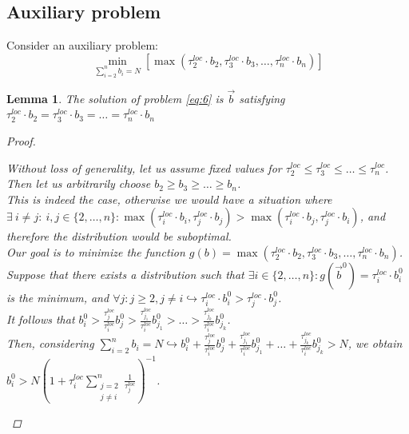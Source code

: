 \documentclass{article}
\newtheorem{lemma}[theorem]{Lemma}
\begin{document}
\subsection{Auxiliary problem}
Consider an auxiliary problem:
\begin{equation}
    \label{eq:6}
    \underset{\sum\limits_{i = 2}^{n} b_i = N}{\min} [\max(\tau_2^{loc}\cdot b_2, \tau_3^{loc}\cdot b_3, \ldots, \tau_n^{loc}\cdot b_n)]
\end{equation}


\begin{lemma}
    \label{l1}
    The solution of problem \eqref{eq:6} is $\overrightarrow{b}$ satisfying $\tau_2^{loc}\cdot b_2 = \tau_3^{loc}\cdot b_3 = \ldots = \tau_n^{loc}\cdot b_n$

    \begin{proof}
        \begin{spacing}{1.3}
        
        Without loss of generality, let us assume fixed values for $\tau_2^{loc}\leq \tau_3^{loc}\leq \ldots \leq \tau_n^{loc}$. \\
        Then let us arbitrarily choose $b_2\geq b_3\geq \ldots \geq b_n$.
        \\
        This is indeed the case, otherwise we would have a situation where $\exists ~ i \neq j: ~ i, j\in \{2, \ldots, n\} : \max(\tau_i^{loc}\cdot b_i, \tau_j^{loc}\cdot b_j) > \max(\tau_i^{loc}\cdot b_j, \tau_j^{loc}\cdot b_i)$, and therefore the distribution would be suboptimal. 
        \\
        Our goal is to minimize the function $g(b) = \max(\tau_2^{loc}\cdot b_2, \tau_3^{loc}\cdot b_3, \ldots, \tau_n^{loc}\cdot b_n)$. 
        \\
        Suppose that there exists a distribution such that $\exists i \in \{2, \ldots, n\}: g(\overrightarrow{b}^0) = \tau_i^{loc}\cdot b_i^0$ is the minimum, and $\forall j: j \geq 2, j \neq i \hookrightarrow \tau_i^{loc}\cdot b_i^0 > \tau_j^{loc}\cdot b_j^0$. 
        \\
        It follows that $b_i^0 > \frac{\tau_j^{loc}}{\tau_i^{loc}}b_j^0 > \frac{\tau_{j_1}^{loc}}{\tau_i^{loc}}b_{j_1}^0 > \ldots > \frac{\tau_{j_k}^{loc}}{\tau_i^{loc}}b_{j_k}^0$. 
        \\
        Then, considering $\sum\limits_{i = 2}^n b_i = N \hookrightarrow b_i^0 + \frac{\tau_j^{loc}}{\tau_i^{loc}}b_j^0 + \frac{\tau_{j_1}^{loc}}{\tau_i^{loc}}b_{j_1}^0 + \ldots + \frac{\tau_{j_k}^{loc}}{\tau_i^{loc}}b_{j_k}^0 > N$,
        we obtain 
        \\
        $b_i^0 > N(1 + \tau_i^{loc}\sum\limits_{\substack{j = 2 \\ j \neq i}}^n \frac{1}{\tau_j^{loc}})^{-1}$.
        

\end{spacing}
\end{proof}
\end{lemma}
\end{document}

